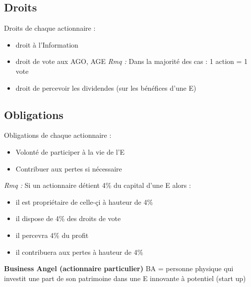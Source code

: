 \documentclass[a4paper,11pt]{report}
\begin{document}
\subsection{Droits}
Droits de chaque actionnaire : 
\begin{itemize}
    \item droit à l'Information
    \item droit de vote aux AGO, AGE 
    \textit{Rmq :} Dans la majorité des cas : 1 action = 1 vote
    \item droit de percevoir les dividendes (sur les bénéfices d'une E)
\end{itemize}
\subsection{Obligations}
Obligations de chaque actionnaire :
\begin{itemize}
    \item Volonté de participer à la vie de l'E
    \item Contribuer aux pertes si nécessaire
\end{itemize}
    \textit{Rmq :} Si un actionnaire détient 4\% du capital d'une E alors :
    \begin{itemize}
        \item il est propriétaire de celle-çi à hauteur de 4\%
        \item il dispose de 4\% des droits de vote
        \item il percevra 4\% du profit
        \item il contribuera aux pertes à hauteur de 4\% 
    \end{itemize} 

    \textbf{Business Angel (actionnaire particulier)}
    BA = personne physique qui investit une part de son patrimoine dans une E innovante à potentiel (start up)\\
    
\end{document}
